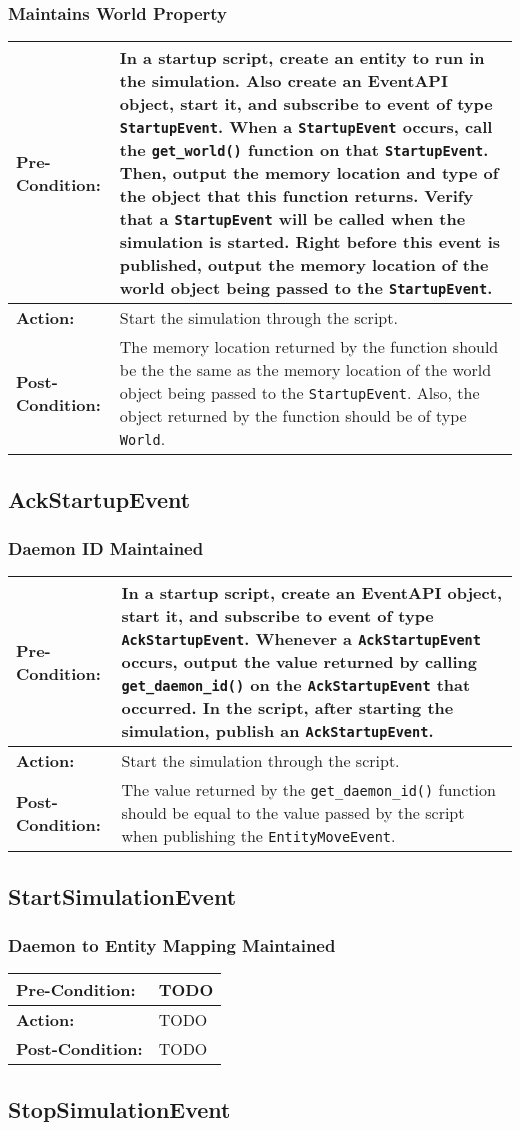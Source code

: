 \documentclass[titlepage]{article}
\newcommand{\testcase}[3]{
    \begin{center}
    \begin{tabular}{| l | p{0.7\textwidth}|}
        \hline
        \rowcolor[gray]{0.8}\textbf{Pre-Condition:} & #1 \\ \hline
        \textbf{Action:} & #2 \\ \hline
        \rowcolor[gray]{0.8}\textbf{Post-Condition:} & #3 \\ \hline
    \end{tabular}
    \end{center}
}
\begin{document}
\subsubsection{Maintains World Property}
\testcase{In a startup script, create an entity to run in the simulation. Also create an EventAPI object, start it, and subscribe to event of type \texttt{StartupEvent}. When a \texttt{StartupEvent} occurs, call the \texttt{get\_world()} function on that \texttt{StartupEvent}. Then, output the memory location and type of the object that this function returns.  Verify that a \texttt{StartupEvent} will be called when the simulation is started. Right before this event is published, output the memory location of the world object being passed to the \texttt{StartupEvent}.}{Start the simulation through the script.}{The memory location returned by the function should be the the same as the memory location of the world object being passed to the \texttt{StartupEvent}. Also, the object returned by the function should be of type \texttt{World}.}

\subsection{AckStartupEvent}
\subsubsection{Daemon ID Maintained}
\testcase{In a startup script, create an EventAPI object, start it, and subscribe to event of type \texttt{AckStartupEvent}. Whenever a \texttt{AckStartupEvent} occurs, output the value returned by calling \texttt{get\_daemon\_id()} on the \texttt{AckStartupEvent} that occurred. In the script, after starting the simulation, publish an \texttt{AckStartupEvent}.}{Start the simulation through the script.}{The value returned by the \texttt{get\_daemon\_id()} function should be equal to the value passed by the script when publishing the \texttt{EntityMoveEvent}.}

\subsection{StartSimulationEvent}
\subsubsection{Daemon to Entity Mapping Maintained}
\testcase{TODO}{TODO}{TODO}

\subsection{StopSimulationEvent}
\end{document}
